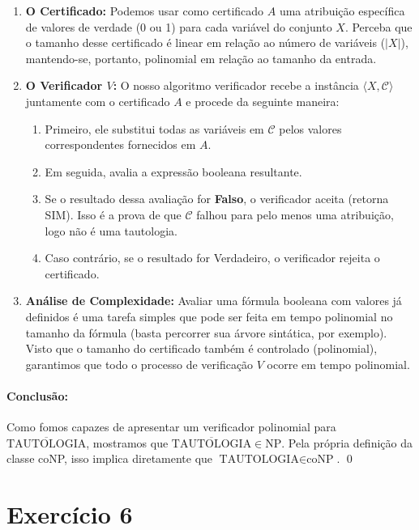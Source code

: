 \documentclass[a4paper,12pt]{article}
\begin{document}
\begin{enumerate}
    \item \textbf{O Certificado:}
    Podemos usar como certificado $A$ uma atribuição específica de valores de verdade (0 ou 1) para cada variável do conjunto $X$. Perceba que o tamanho desse certificado é linear em relação ao número de variáveis ($|X|$), mantendo-se, portanto, polinomial em relação ao tamanho da entrada.

    \item \textbf{O Verificador $V$:}
    O nosso algoritmo verificador recebe a instância $\langle X, \mathcal{C} \rangle$ juntamente com o certificado $A$ e procede da seguinte maneira:
    \begin{enumerate}
        \item Primeiro, ele substitui todas as variáveis em $\mathcal{C}$ pelos valores correspondentes fornecidos em $A$.
        \item Em seguida, avalia a expressão booleana resultante.
        \item Se o resultado dessa avaliação for \textbf{Falso}, o verificador aceita (retorna SIM). Isso é a prova de que $\mathcal{C}$ falhou para pelo menos uma atribuição, logo não é uma tautologia.
        \item Caso contrário, se o resultado for Verdadeiro, o verificador rejeita o certificado.
    \end{enumerate}
    
    \item \textbf{Análise de Complexidade:}
    Avaliar uma fórmula booleana com valores já definidos é uma tarefa simples que pode ser feita em tempo polinomial no tamanho da fórmula (basta percorrer sua árvore sintática, por exemplo). Visto que o tamanho do certificado também é controlado (polinomial), garantimos que todo o processo de verificação $V$ ocorre em tempo polinomial.
\end{enumerate}

\paragraph{Conclusão:}
Como fomos capazes de apresentar um verificador polinomial para $\overline{\text{TAUTOLOGIA}}$, mostramos que $\overline{\text{TAUTOLOGIA}} \in \text{NP}$. Pela própria definição da classe coNP, isso implica diretamente que $\text{TAUTOLOGIA} \in \text{coNP}$. \qed

\newpage

\section*{Exercício 6}
\end{document}
